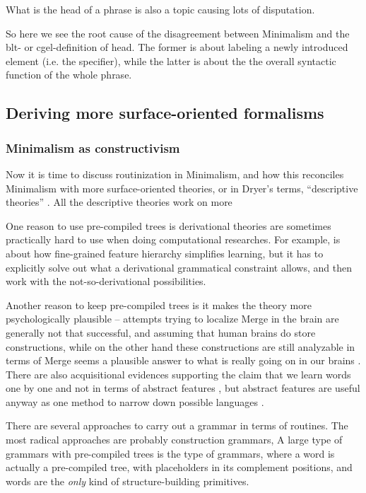 \documentclass[../main.tex]{subfiles}
\begin{document}
What is the head of a phrase is also a topic causing lots of disputation. 

So here we see the root cause of the disagreement between Minimalism and the \ac{blt}- or \ac{cgel}-definition 
of head. The former is about labeling a newly introduced element (i.e. the specifier), while the latter is about 
the the overall syntactic function of the whole phrase. 

\subsection{Deriving more surface-oriented formalisms}

\subsubsection{Minimalism as constructivism}\label{sec:routine}

Now it is time to discuss routinization in Minimalism, and how this reconciles Minimalism with more 
surface-oriented theories, or in Dryer's terms, ``descriptive theories'' \citep{dryer2006descriptive}.
All the descriptive theories work on more %

One reason to use pre-compiled trees is derivational theories are sometimes 
practically hard to use when doing computational researches. For example, \citet{liter2020modeling}
is about how fine-grained feature hierarchy simplifies learning, but it has to explicitly solve out what 
a derivational grammatical constraint allows, and then work with the not-so-derivational possibilities.

Another reason to keep pre-compiled trees is it makes the theory more psychologically plausible --
attempts trying to localize Merge in the brain are generally not that successful, and assuming that 
human brains do store constructions, while on the other hand these constructions are still analyzable 
in terms of Merge seems a plausible answer to what is really going on in our brains
\citep{brain-syntax-1,brain-syntax-2}. There are also acquisitional evidences supporting the claim 
that we learn words one by one and not in terms of abstract features \citep{white2022lexicalization},
but abstract features are useful anyway as one method to narrow down possible languages \citep{liter2020modeling}.

There are several approaches to carry out a grammar in terms of routines. The most radical approaches
are probably construction grammars, %
A large type of grammars with pre-compiled trees is the type of  grammars, where 
a word is actually a pre-compiled tree, with placeholders in its complement positions, and words 
are the \emph{only} kind of structure-building primitives. %
\end{document}
